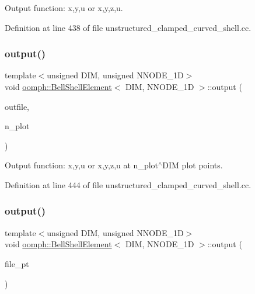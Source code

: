 Output function\+: x,y,u or x,y,z,u. 



Definition at line 438 of file unstructured\+\_\+clamped\+\_\+curved\+\_\+shell.\+cc.

\mbox{\label{classoomph_1_1BellShellElement_a3bd16bf3ed27512990a593f8af97826d}} 
\subsubsection{\texorpdfstring{output()}{output()}\hspace{0.1cm}{\footnotesize\ttfamily [2/4]}}
{\footnotesize\ttfamily template$<$unsigned D\+IM, unsigned N\+N\+O\+D\+E\+\_\+1D$>$ \\
void \hyperlink{classoomph_1_1BellShellElement}{oomph\+::\+Bell\+Shell\+Element}$<$ D\+IM, N\+N\+O\+D\+E\+\_\+1D $>$\+::output (\begin{DoxyParamCaption}\item[{std\+::ostream \&}]{outfile,  }\item[{const unsigned \&}]{n\+\_\+plot }\end{DoxyParamCaption})\hspace{0.3cm}{\ttfamily [inline]}}



Output function\+: x,y,u or x,y,z,u at n\+\_\+plot$^\wedge$\+D\+IM plot points. 



Definition at line 444 of file unstructured\+\_\+clamped\+\_\+curved\+\_\+shell.\+cc.

\mbox{\label{classoomph_1_1BellShellElement_a9abec4ec4338f67f88fcda4ff143e972}} 
\subsubsection{\texorpdfstring{output()}{output()}\hspace{0.1cm}{\footnotesize\ttfamily [3/4]}}
{\footnotesize\ttfamily template$<$unsigned D\+IM, unsigned N\+N\+O\+D\+E\+\_\+1D$>$ \\
void \hyperlink{classoomph_1_1BellShellElement}{oomph\+::\+Bell\+Shell\+Element}$<$ D\+IM, N\+N\+O\+D\+E\+\_\+1D $>$\+::output (\begin{DoxyParamCaption}\item[{F\+I\+LE $\ast$}]{file\+\_\+pt }\end{DoxyParamCaption})\hspace{0.3cm}{\ttfamily [inline]}}



